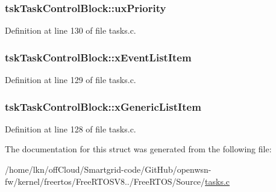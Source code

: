 \subsubsection[{\texorpdfstring{ux\+Priority}{uxPriority}}]{ tsk\+Task\+Control\+Block\+::ux\+Priority}\hypertarget{structtsk_task_control_block_a79187811e3d2a15595942e3b44237d85}{}\label{structtsk_task_control_block_a79187811e3d2a15595942e3b44237d85}


Definition at line 130 of file tasks.\+c.

\subsubsection[{\texorpdfstring{x\+Event\+List\+Item}{xEventListItem}}]{ tsk\+Task\+Control\+Block\+::x\+Event\+List\+Item}\hypertarget{structtsk_task_control_block_a1a1612b6081a13683808284d93a9b28f}{}\label{structtsk_task_control_block_a1a1612b6081a13683808284d93a9b28f}


Definition at line 129 of file tasks.\+c.

\subsubsection[{\texorpdfstring{x\+Generic\+List\+Item}{xGenericListItem}}]{ tsk\+Task\+Control\+Block\+::x\+Generic\+List\+Item}\hypertarget{structtsk_task_control_block_af331a67daadbafd0e66098e8111cfa4b}{}\label{structtsk_task_control_block_af331a67daadbafd0e66098e8111cfa4b}


Definition at line 128 of file tasks.\+c.



The documentation for this struct was generated from the following file\+:\begin{DoxyCompactItemize}
\item 
/home/lkn/off\+Cloud/\+Smartgrid-\/code/\+Git\+Hub/openwsn-\/fw/kernel/freertos/\+Free\+R\+T\+O\+S\+V8../\+Free\+R\+T\+O\+S/\+Source/\hyperlink{tasks_8c}{tasks.\+c}\end{DoxyCompactItemize}
